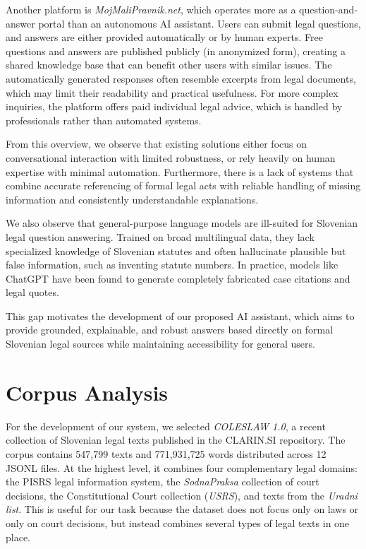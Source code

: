 \documentclass[fleqn,moreauthors,10pt]{ds_report}
\begin{document}
Another platform is \textit{MojMaliPravnik.net}, which operates more as a question-and-answer portal
than an autonomous AI assistant. \cite{MojMaliPravnik.net} Users can submit legal questions, and answers are either provided
automatically or by human experts. Free questions and answers are published publicly (in anonymized form),
creating a shared knowledge base that can benefit other users with similar issues.
The automatically generated responses often resemble excerpts from legal documents,
which may limit their readability and practical usefulness. For more complex inquiries,
the platform offers paid individual legal advice, which is handled by professionals rather
than automated systems.

From this overview, we observe that existing solutions either focus on conversational interaction
with limited robustness, or rely heavily on human expertise with minimal automation.
Furthermore, there is a lack of systems that combine accurate referencing of formal legal acts
with reliable handling of missing information and consistently understandable explanations.

We also observe that general-purpose language models are ill-suited for Slovenian legal question answering.
Trained on broad multilingual data, they lack specialized knowledge of Slovenian statutes and often
hallucinate plausible but false information, such as inventing statute numbers.
In practice, models like ChatGPT have been found to generate completely fabricated case citations
and legal quotes.

This gap motivates the development of our proposed AI assistant, which aims to provide grounded,
explainable, and robust answers based directly on formal Slovenian legal sources while maintaining
accessibility for general users.

\section*{Corpus Analysis}

For the development of our system, we selected \textit{COLESLAW 1.0}, a recent collection of
Slovenian legal texts published in the CLARIN.SI repository. \cite{COLESLAW1.0} The corpus contains
547,799 texts and 771,931,725 words distributed across 12 JSONL files. At the highest level, it
combines four complementary legal domains: the PISRS legal information system, the
\textit{SodnaPraksa} collection of court decisions, the Constitutional Court collection
(\textit{USRS}), and texts from the \textit{Uradni list}. This is useful for our task because the
dataset does not focus only on laws or only on court decisions, but instead combines several types
of legal texts in one place.
\end{document}
